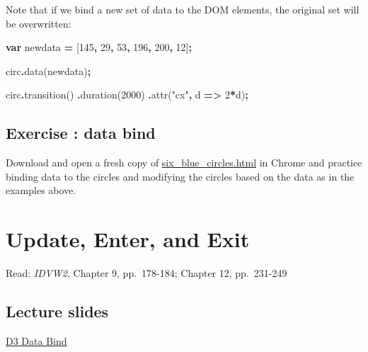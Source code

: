 \documentclass[
  openany]{book}
\newenvironment{Shaded}{\begin{snugshade}}{\end{snugshade}}
\newcommand{\DecValTok}[1]{\textcolor[rgb]{0.00,0.00,0.81}{#1}}
\newcommand{\FunctionTok}[1]{\textcolor[rgb]{0.00,0.00,0.00}{#1}}
\newcommand{\KeywordTok}[1]{\textcolor[rgb]{0.13,0.29,0.53}{\textbf{#1}}}
\newcommand{\NormalTok}[1]{#1}
\newcommand{\OperatorTok}[1]{\textcolor[rgb]{0.81,0.36,0.00}{\textbf{#1}}}
\newcommand{\StringTok}[1]{\textcolor[rgb]{0.31,0.60,0.02}{#1}}
\begin{document}
Note that if we bind a new set of data to the DOM elements, the original set will be overwritten:

\begin{Shaded}
\begin{Highlighting}[]
\KeywordTok{var}\NormalTok{ newdata }\OperatorTok{=}\NormalTok{ [}\DecValTok{145}\OperatorTok{,} \DecValTok{29}\OperatorTok{,} \DecValTok{53}\OperatorTok{,} \DecValTok{196}\OperatorTok{,} \DecValTok{200}\OperatorTok{,} \DecValTok{12}\NormalTok{]}\OperatorTok{;}

\NormalTok{circ}\OperatorTok{.}\FunctionTok{data}\NormalTok{(newdata)}\OperatorTok{;}

\NormalTok{circ}\OperatorTok{.}\FunctionTok{transition}\NormalTok{()}
    \OperatorTok{.}\FunctionTok{duration}\NormalTok{(}\DecValTok{2000}\NormalTok{)}
    \OperatorTok{.}\FunctionTok{attr}\NormalTok{(}\StringTok{"cx"}\OperatorTok{,}\NormalTok{ d }\KeywordTok{=\textgreater{}} \DecValTok{2}\OperatorTok{*}\NormalTok{d)}\OperatorTok{;}
\end{Highlighting}
\end{Shaded}

\hypertarget{exercise-data-bind}{%
\section{Exercise : data bind}\label{exercise-data-bind}}

Download and open a fresh copy of \href{https://raw.githubusercontent.com/jtr13/d3book/master/code/six_blue_circles.html}{six\_blue\_circles.html} in Chrome and practice binding data to the circles and modifying the circles based on the data as in the examples above.

\hypertarget{update-enter-and-exit}{%
\chapter{\texorpdfstring{Update, Enter, and Exit }{Update, Enter, and Exit }}\label{update-enter-and-exit}}

Read: \emph{IDVW2}, Chapter 9, pp.~178-184; Chapter 12, pp.~231-249

\hypertarget{lecture-slides}{%
\section{\texorpdfstring{Lecture slides }{Lecture slides }}\label{lecture-slides}}

\href{https://github.com/jtr13/D3/blob/master/UpdateEnterExit.pdf}{D3 Data Bind}
\end{document}
